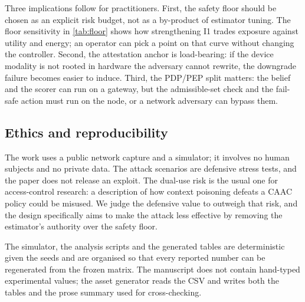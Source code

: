 Three implications follow for practitioners. First, the safety floor should be
chosen as an explicit risk budget, not as a by-product of estimator tuning. The
floor sensitivity in \cref{tab:floor} shows how strengthening I1 trades exposure
against utility and energy; an operator can pick a point on that curve without
changing the controller. Second, the attestation anchor is load-bearing: if the
device modality is not rooted in hardware the adversary cannot rewrite, the
downgrade failure becomes easier to induce. Third, the PDP/PEP split matters: the
belief and the scorer can run on a gateway, but the admissible-set check and the
fail-safe action must run on the node, or a network adversary can bypass them.

\subsection{Ethics and reproducibility}
\label{sec:ethics}

The work uses a public network capture and a simulator; it involves no human
subjects and no private data. The attack scenarios are defensive stress tests, and
the paper does not release an exploit. The dual-use risk is the usual one for
access-control research: a description of how context poisoning defeats a CAAC
policy could be misused. We judge the defensive value to outweigh that risk, and
the design specifically aims to make the attack less effective by removing the
estimator's authority over the safety floor.

The simulator, the analysis scripts and the generated tables are deterministic
given the seeds and are organised so that every reported number can be regenerated
from the frozen matrix. The manuscript does not contain hand-typed experimental
values; the asset generator reads the CSV and writes both the tables and the prose
summary used for cross-checking.
